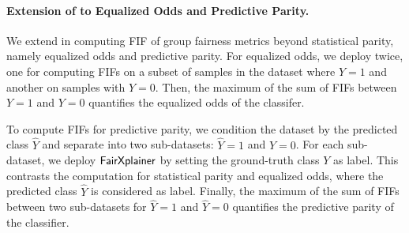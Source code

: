 






\paragraph{Extension of {\fairXplainer} to Equalized Odds and Predictive Parity.} 
We extend {\fairXplainer} in computing FIF of group fairness metrics beyond statistical parity, namely equalized odds and predictive parity. For equalized odds, we deploy {\fairXplainer} twice, one for computing FIFs on a subset of samples in the dataset where $ Y = 1 $ and another on samples with $ Y = 0 $. Then, the maximum of the sum of FIFs between $ Y = 1 $ and $ Y = 0 $ quantifies the equalized odds of the classifer.  


To compute FIFs for predictive parity, we condition the dataset by the predicted class $ \widehat{Y} $ and separate into two sub-datasets: $ \widehat{Y} = 1 $ and  $ \widehat{Y} = 0 $. For each sub-dataset, we deploy $ \mathsf{FairXplainer} $ by setting the ground-truth class $ Y $ as label. This contrasts the computation for  statistical parity and equalized odds, where the predicted class $ \widehat{Y} $ is considered as label. Finally, the maximum of the sum of FIFs between two sub-datasets for $ \widehat{Y} = 1 $ and  $ \widehat{Y} = 0 $ quantifies the predictive parity of the classifier.

 